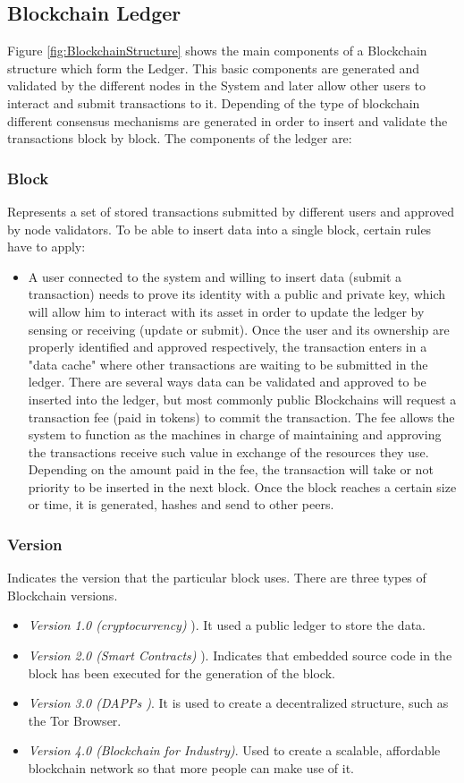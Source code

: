 \subsection{Blockchain Ledger}
Figure \ref{fig:BlockchainStructure} shows the main components of a Blockchain structure which form the Ledger. This basic components are generated and validated by the different nodes in the System and later allow other users to interact and submit transactions to it. Depending of the type of blockchain different consensus mechanisms are generated in order to insert and validate the transactions block by block. 
The components of the ledger are:
\subsubsection{Block}
Represents a set of stored transactions submitted by different users and approved by node validators. To be able to insert data into a single block, certain rules have to apply: 
\begin{itemize}
    \item A user connected to the system and willing to insert data (submit a transaction) needs to prove its identity with a public and private key, which will allow him to interact with its asset in order to update the ledger by sensing or receiving (update or submit). Once the user and its ownership are properly identified and approved respectively, the transaction enters in a "data cache" where other transactions are waiting to be submitted in the ledger. There are several ways data can be validated and approved to be inserted into the ledger, but most commonly public Blockchains will request a transaction fee (paid in tokens) to commit the transaction. The fee allows the system to function as the machines in charge of maintaining and approving the transactions receive such value in exchange of the resources they use. Depending on the amount paid in the fee, the transaction will take or not priority to be inserted in the next block. Once the block reaches a certain size or time, it is generated, hashes and send to other peers.
\end{itemize}

\subsubsection{Version}
Indicates the version that the particular block uses. There are three types of Blockchain versions.

\begin{itemize}
    \item \emph{Version 1.0 (cryptocurrency)} ). It used a public ledger to store the data.
    \item \emph{Version 2.0 (Smart Contracts)} ). Indicates that embedded source code in the block has been executed for the generation of the block.
    \item \emph{Version 3.0 (\ac{DAPP}s )}. It is used to create a decentralized structure, such as the Tor Browser.
    \item \emph{Version 4.0 (Blockchain for Industry)}. Used to create a scalable, affordable blockchain network so that more people can make use of it.
\end{itemize}
 
